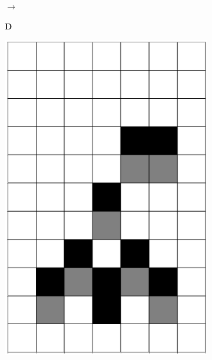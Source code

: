 \documentclass[12pt]{article}
\numberwithin{figure}{section} %
\begin{document}
\begin{figure}[H]
\begin{subfigure}[t]{0.03\textwidth}
      		{\LARGE$\xrightarrow{}$}
	\end{subfigure}
      	\newline
   	\setcounter{subfigure}{0}
     	\begin{subfigure}[t]{0.03\textwidth}
    		\textbf{D}
  	\end{subfigure}		
         \begin{subfigure}{0.3\textwidth}
     		\centering
     		\includegraphics[angle=270,width=\linewidth]{Section4/6.0}
     		\subcaption{}
   	\end{subfigure}
     	\begin{subfigure}{0.3\textwidth}
     		\centering

\end{subfigure}
\end{figure}
\end{document}
